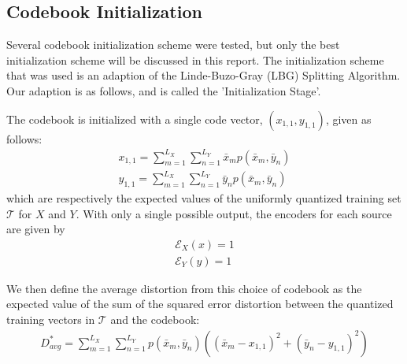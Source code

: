 \subsection{Codebook Initialization}
%

Several codebook initialization scheme were tested, but only the best initialization scheme will be discussed in this report. The initialization scheme that was used is an adaption of the Linde-Buzo-Gray (LBG) Splitting Algorithm. Our adaption is as follows, and is called the 'Initialization Stage'.

The codebook is initialized with a single code vector, $(x_{1,1},y_{1,1})$, given as follows:
\begin{align}
    x_{1,1} = \sum_{m=1}^{L_X}\sum_{n=1}^{L_Y}\bar x_m p(\bar x_m, \bar y_n)\\
    y_{1,1} = \sum_{m=1}^{L_X}\sum_{n=1}^{L_Y}\bar y_n p(\bar x_m, \bar y_n)
\end{align}
which are respectively the expected values of the uniformly quantized training set $\mathcal T$ for $X$ and $Y$. With only a single possible output, the encoders for each source are given by
\begin{align}
    \mathcal E_X(x) = 1\\
    \mathcal E_Y(y) = 1
\end{align}

We then define the average distortion from this choice of codebook as the expected value of the sum of the squared error distortion between the quantized training vectors in $\mathcal T$ and the codebook:
\begin{align}
    D^*_{avg}=\sum_{m=1}^{L_X}\sum_{n=1}^{L_Y}p(\bar x_m,\bar y_n)\left((\bar x_m-x_{1,1})^2+(\bar y_n-y_{1,1})^2\right)\\
\end{align}

